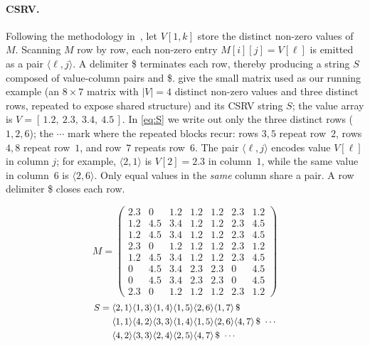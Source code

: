 \documentclass[twoside,leqno,twocolumn]{article}
\begin{document}
\paragraph{CSRV.}

Following the methodology in~\cite{mmrepair}, let $V[1,k]$ store the distinct non-zero values of $M$. Scanning $M$ row by row, each non-zero entry $M[i][j]=V[\ell]$ is emitted as a pair $\langle\ell,j\rangle$. A delimiter \$ terminates each row, thereby producing a string $S$ composed of value-column pairs and \$.  give the small matrix used as our running example (an $8\times7$ matrix with $|V|=4$ distinct non-zero values and three distinct rows, repeated to expose shared structure) and its CSRV string $S$; the value array is $V=[\,1.2,\ 2.3,\ 3.4,\ 4.5\,]$. In \cref{eq:S} we write out only the three distinct rows ($1,2,6$); the $\cdots$ mark where the repeated blocks recur: rows $3,5$ repeat row~$2$, rows $4,8$ repeat row~$1$, and row~$7$ repeats row~$6$. The pair $\langle\ell,j\rangle$ encodes value $V[\ell]$ in column $j$; for example, $\langle2,1\rangle$ is $V[2]=2.3$ in column~$1$, while the same value in column~$6$ is $\langle2,6\rangle$. Only equal values in the \emph{same} column share a pair. A row delimiter \$ closes each row.

{\setlength{\arraycolsep}{3pt}
\begin{equation}\label{eq:M}
M=\begin{pmatrix}
2.3 & 0 & 1.2 & 1.2 & 1.2 & 2.3 & 1.2\\
1.2 & 4.5 & 3.4 & 1.2 & 1.2 & 2.3 & 4.5\\
1.2 & 4.5 & 3.4 & 1.2 & 1.2 & 2.3 & 4.5\\
2.3 & 0 & 1.2 & 1.2 & 1.2 & 2.3 & 1.2\\
1.2 & 4.5 & 3.4 & 1.2 & 1.2 & 2.3 & 4.5\\
0 & 4.5 & 3.4 & 2.3 & 2.3 & 0 & 4.5\\
0 & 4.5 & 3.4 & 2.3 & 2.3 & 0 & 4.5\\
2.3 & 0 & 1.2 & 1.2 & 1.2 & 2.3 & 1.2
\end{pmatrix}
\end{equation}}
\begin{equation}\label{eq:S}
\small
\begin{aligned}
S={} & \langle2,1\rangle\langle1,3\rangle\langle1,4\rangle\langle1,5\rangle\langle2,6\rangle\langle1,7\rangle\,\$ \\
     & \langle1,1\rangle\langle4,2\rangle\langle3,3\rangle\langle1,4\rangle\langle1,5\rangle\langle2,6\rangle\langle4,7\rangle\,\$\ \cdots \\
     & \langle4,2\rangle\langle3,3\rangle\langle2,4\rangle\langle2,5\rangle\langle4,7\rangle\,\$\ \cdots
\end{aligned}
\end{equation}
\end{document}
